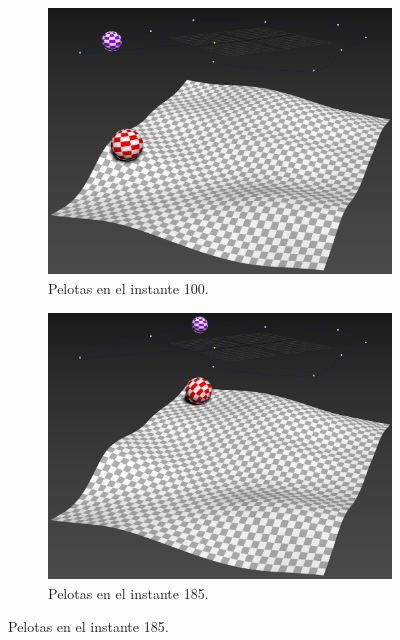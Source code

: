 \begin{figure}[H]
    \centering 
	\begin{subfigure}[t]{0.48\textwidth}
	    \centering
	    \includegraphics[width=\textwidth]{imagenes/rotacion/100.jpg}
        \caption{Pelotas en el instante 100.}
    \end{subfigure}
    \hfill 
	\begin{subfigure}[t]{0.48\textwidth}
	    \centering
	    \includegraphics[width=\textwidth]{imagenes/rotacion/185.jpg}
        \caption{Pelotas en el instante 185.}
    \end{subfigure}    

\end{figure}
